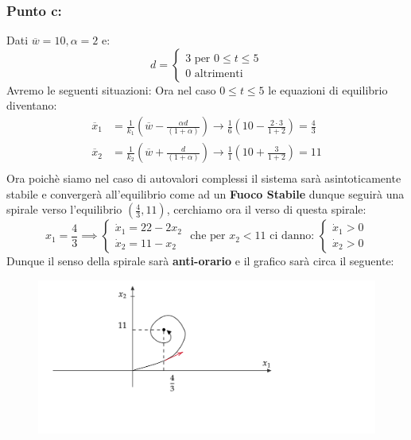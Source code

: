 \documentclass[a4paper]{report}
\begin{document}
\subsubsection*{Punto c:}
Dati $\overline{w}=10,\alpha=2$ e:
\[
d=\left\{\begin{array}{l}
3 \text{ per } 0\leq t \leq 5\\
0 \text{ altrimenti}
\end{array}
\right.
\]
Avremo le seguenti situazioni:
\bigskip \newline
\medskip\newline
Ora nel caso $0\leq t\leq5$ le equazioni di equilibrio diventano:
\begin{align*}
\overline{x}_1&=\frac{1}{k_1}\left(\overline{w}-\frac{\alpha d}{(1+\alpha)}\right)\longrightarrow\frac{1}{6}\left(10-\frac{2\cdot 3}{1+2}\right)=\frac{4}{3}\\
\overline{x}_2&=\frac{1}{k_2}\left(\overline{w}+\frac{d}{(1+\alpha)}\right)\longrightarrow\frac{1}{1}\left(10+\frac{3}{1+2}\right)=11\\
\end{align*}
Ora poichè siamo nel caso di autovalori complessi il sistema sarà asintoticamente stabile e convergerà all'equilibrio come ad un \textbf{Fuoco Stabile} dunque seguirà una spirale verso l'equilibrio $\left(\frac{4}{3},11\right)$, cerchiamo ora il verso di questa spirale:
\[
x_1=\frac{4}{3}\implies\left\{\begin{array}{l}
\dot{x}_1=22-2x_2 \\
\dot{x}_2=11-x_2
\end{array}
\right.\text{ che per }x_2<11 \text{ ci danno: } \left\{\begin{array}{l}
\dot{x}_1>0\\
\dot{x}_2>0
\end{array}\right.
\]
Dunque il senso della spirale sarà \textbf{anti-orario} e il grafico sarà circa il seguente:
\begin{figure}[h]
\includegraphics[width=\textwidth]{diagtj1}
\end{figure}\newline
\end{document}
